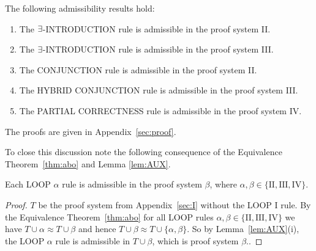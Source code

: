 \documentclass[manuscript, screen, review]{acmart}
\begin{document}
\begin{lemma}[Admissibility] \label{lem:admissibility}
The following admissibility results hold:

 \begin{enumerate} [$(i)$] 
    
   \item The $\mbox{$\exists$}$-{\rm INTRODUCTION} rule is admissible in the proof system {\rm II}. 
   
    \vspace{2mm}
        
   \item The $\mbox{$\exists$}$-{\rm INTRODUCTION} rule is admissible in the proof system {\rm III}.
   
    \vspace{2mm}
  
   \item The {\rm CONJUNCTION} rule is admissible in the proof system {\rm II}.
   
    \vspace{2mm}

   \item The {\rm HYBRID CONJUNCTION} rule is admissible in the proof system {\rm III}.
         
    \vspace{2mm}
         
   \item The {\rm PARTIAL CORRECTNESS} rule is admissible in the proof system {\rm IV}.

 \end{enumerate}

\end{lemma}

The proofs are given in
Appendix~\ref{sec:proof}.



To close this discussion note the following consequence of the Equivalence Theorem~\ref{thm:abo}
and Lemma \ref{lem:AUX}.

\begin{corollary} \label{corr:admiss}
Each {\rm LOOP} $\alpha$ rule is admissible in the proof system $\beta$, 
        where $\alpha, \beta \in \{\mathrm{II, III, IV}\}$.
\end{corollary}


\begin{proof}
  $T$ be the proof system from Appendix~\ref{sec:I} without the LOOP I
  rule.  By the Equivalence Theorem~\ref{thm:abo} for all LOOP rules
  $\alpha, \beta \in \{\mathrm{II, III, IV}\}$ we have
  $T \cup \alpha \approx T \cup \beta$ and hence
  $T \cup \beta \approx T \cup \{\alpha, \beta\}$.  So by
  Lemma~\ref{lem:AUX}(i), the LOOP $\alpha$ rule is 
  admissible in $T \cup \beta$, which is proof system $\beta$..
\end{proof}
\end{document}
